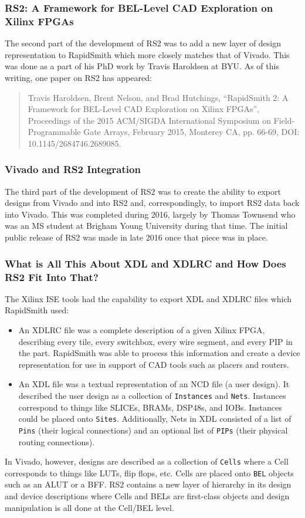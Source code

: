 \documentclass[12pt]{article}
\newcommand{\cls}[1]{{\texttt{#1}}}
\begin{document}
\subsubsection{RS2: A Framework for BEL-Level CAD Exploration on Xilinx FPGAs}
The second part of the development of RS2 was to add a new layer of design
representation to RapidSmith which more closely matches that of Vivado.  This
was done as a part of his PhD work by Travis Haroldsen at BYU.  As of this
writing, one paper on RS2 has appeared:

\begin{quotation}Travis Haroldsen, Brent Nelson, and Brad Hutchings, “RapidSmith
2:
A Framework for BEL-Level CAD Exploration on Xilinx FPGAs”, Proceedings of the
2015 ACM/SIGDA International Symposium on Field-Programmable Gate Arrays,
February 2015, Monterey CA, pp. 66-69, DOI: 10.1145/2684746.2689085.
\end{quotation}

\subsubsection{Vivado and RS2 Integration}
The third part of the development of RS2 was to create the ability to export
designs from Vivado and into RS2 and, correspondingly, to import RS2 data back
into Vivado.  This was completed during 2016, largely by Thomas Townsend who was
an MS student at Brigham Young University during that time.  The initial public
release of RS2 was made in late 2016 once that piece was in place.

\subsubsection{What is All This About XDL and XDLRC and How Does RS2 Fit Into
That?} 
The Xilinx ISE tools had the capability to export XDL and XDLRC files which
RapidSmith used: 
\begin{itemize}
  \item An XDLRC file was a complete description of a given Xilinx FPGA,
  describing every tile, every switchbox, every wire segment, and every PIP in
  the part.  RapidSmith was able to process this information and create a device
  representation for use in support of CAD tools such as placers and routers.
  \item An XDL file was a textual representation of an NCD file (a user design).
  It described the user design as a collection of \cls{Instances} and \cls{Nets}. Instances
  correspond to things like {SLICEs}, {BRAMs}, {DSP48s}, and {IOBs}.  Instances could be
  placed onto \cls{Sites}. Additionally, Nets in XDL consisted of a list of
  \cls{Pins} (their logical connections) and an optional list of \cls{PIPs} (their physical
  routing connections).
\end{itemize}
In Vivado, however, designs are described as a collection of \cls{Cells} where a Cell
corresponds to things like LUTs, flip flops, etc.  Cells are placed onto \cls{BEL}
objects such as an ALUT or a BFF.  RS2 contains a new layer of hierarchy in its
design and device descriptions where Cells and BELs are first-class objects and
design manipulation is all done at the Cell/BEL level.
\end{document}
